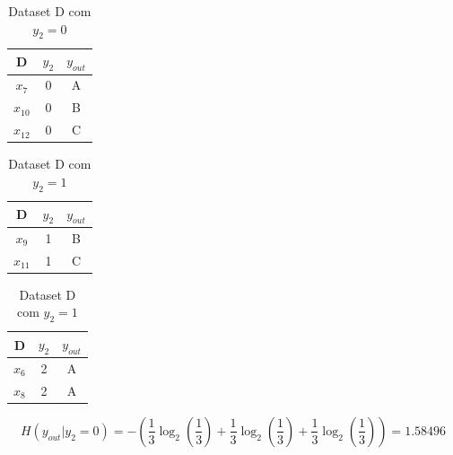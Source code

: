 \documentclass{article}
\begin{document}
\begin{multicols}{3}
  \setlength{\columnseprule}{0pt}
  
  \begin{table}[H]
    \centering
    \begin{tabular}{|c|c|c|}
    \hline
        D     & $y_2$ & $y_{out}$ \\ \hline
        $x_7$ & 0     & A         \\ \hline
        $x_{10}$ & 0     & B         \\ \hline
        $x_{12}$ & 0     & C         \\ \hline
    \end{tabular}
    \caption{Dataset D com $y_2 = 0$}
    \label{tab:datasetDy2=0}
    \end{table}

\vspace*{\fill}
\collumnbreak

\begin{table}[H]
  \centering
  \begin{tabular}{|c|c|c|}
  \hline
      D     & $y_2$ & $y_{out}$ \\ \hline
      $x_9$ & 1     & B         \\ \hline
      $x_{11}$ & 1     & C         \\ \hline
  \end{tabular}
  \caption{Dataset D com $y_2 = 1$}
  \label{tab:datasetDy2=1}
  \end{table}

\vspace*{\fill}
\collumnbreak

\begin{table}[H]
  \centering
  \begin{tabular}{|c|c|c|}
  \hline
      D     & $y_2$ & $y_{out}$ \\ \hline
      $x_6$ & 2     & A         \\ \hline
      $x_8$ & 2     & A         \\ \hline
  \end{tabular}
  \caption{Dataset D com $y_2 = 1$}
  \label{tab:datasetDy2=1}
  \end{table}

\end{multicols}

\[ H(y_{out}|y_2 = 0) = - \left( \frac{1}{3} \log_2 \left( \frac{1}{3} \right) + \frac{1}{3} \log_2 \left( \frac{1}{3} \right) + \frac{1}{3} \log_2 \left( \frac{1}{3} \right) \right) = 1.58496 \]
\end{document}
